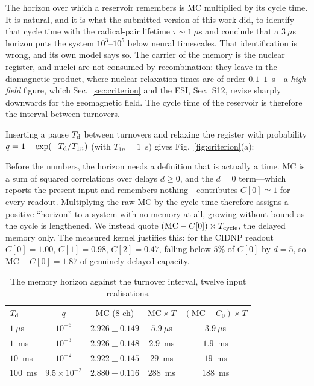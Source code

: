 \documentclass[aps,prx,reprint,superscriptaddress,nofootinbib,floatfix]{revtex4-2}
\begin{document}
The horizon over which a reservoir remembers is $\mathrm{MC}$ multiplied by its
cycle time. It is natural, and it is what the submitted version of this work did, to
identify that cycle time with the radical-pair lifetime $\tau\sim1~\mu$s and
conclude that a $3~\mu$s horizon puts the system $10^3$--$10^5$ below neural
timescales. That identification is wrong, and its own model says so. The carrier of
the memory is the nuclear register, and nuclei are not consumed by recombination:
they leave in the diamagnetic product, where nuclear relaxation times are of order
$0.1$--$1$~s---a \emph{high-field} figure, which Sec.~\ref{sec:criterion} and the
ESI, Sec.~S12, revise sharply downwards for the geomagnetic
field. The cycle time of the reservoir is therefore the interval between
turnovers.

Inserting a pause $T_{\rm d}$ between turnovers and relaxing the register with
probability $q=1-\exp(-T_{\rm d}/T_{1n})$ (with $T_{1n}=1$~s) gives
Fig.~\ref{fig:criterion}(a):

Before the numbers, the horizon needs a definition that is actually a time.
$\mathrm{MC}$ is a sum of squared correlations over delays $d\ge0$, and the $d=0$
term---which reports the present input and remembers nothing---contributes
$C[0]\simeq1$ for every readout. Multiplying the raw $\mathrm{MC}$ by the cycle
time therefore assigns a positive ``horizon'' to a system with no memory at all,
growing without bound as the cycle is lengthened. We instead quote
$(\mathrm{MC}-C[0])\times T_{\rm cycle}$, the delayed memory only. The measured
kernel justifies this: for the CIDNP readout $C[0]=1.00$, $C[1]=0.98$,
$C[2]=0.47$, falling below $5\%$ of $C[0]$ by $d=5$, so
$\mathrm{MC}-C[0]=1.87$ of genuinely delayed capacity.

\begin{table}[htbp]
\caption{\label{tab:clock_main}The memory horizon against the turnover interval, twelve input realisations.}
\begin{ruledtabular}
\begin{tabular}{lcccc}
$T_{\rm d}$ & $q$ & MC (8 ch) & $\mathrm{MC}\times T$ & $(\mathrm{MC}-C_0)\times T$ \\
$1~\mu$s & $10^{-6}$ & $2.926\pm0.149$ & $5.9~\mu$s & $3.9~\mu$s \\
$1$~ms & $10^{-3}$ & $2.926\pm0.148$ & $2.9$~ms & $1.9$~ms \\
$10$~ms & $10^{-2}$ & $2.922\pm0.145$ & $29$~ms & $19$~ms \\
$100$~ms & $9.5\times10^{-2}$ & $2.880\pm0.116$ & $288$~ms & $188$~ms \\
\end{tabular}
\end{ruledtabular}
\end{table}
\end{document}
